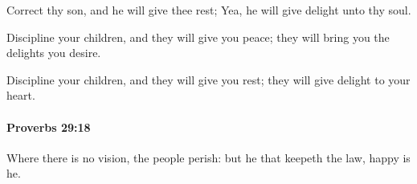 			\begin{versebox}
					\item[BHS] 
					\item[ASV] Correct thy son, and he will give thee rest; Yea, he will give delight unto thy soul.
					\item[NIV] Discipline your children, and they will give you peace; they will bring you the delights you desire.
					\item[NRSV] Discipline your children, and they will give you rest; they will give delight to your heart.
			\end{versebox}

		\paragraph{Proverbs 29:18} %
			\label{PROVERBS-29-18}

			Where there is no vision, the people perish: but he that keepeth the law, happy is he.


